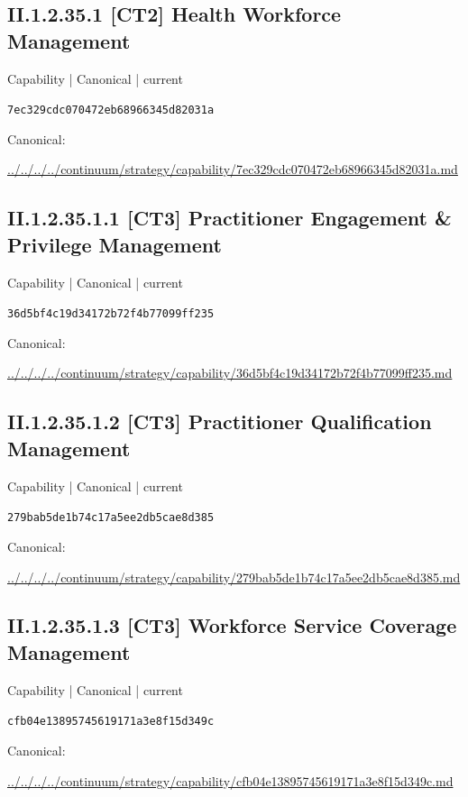 \documentclass[10pt,a4paper]{article}
\begin{document}
\subsection*{II.1.2.35.1 [CT2] Health Workforce Management}
{\small Capability | Canonical | current}\par
\texttt{7ec329cdc070472eb68966345d82031a}\par
Canonical: \par
{\footnotesize\url{../../../../continuum/strategy/capability/7ec329cdc070472eb68966345d82031a.md}}\par
\subsection*{II.1.2.35.1.1 [CT3] Practitioner Engagement \& Privilege Management}
{\small Capability | Canonical | current}\par
\texttt{36d5bf4c19d34172b72f4b77099ff235}\par
Canonical: \par
{\footnotesize\url{../../../../continuum/strategy/capability/36d5bf4c19d34172b72f4b77099ff235.md}}\par
\subsection*{II.1.2.35.1.2 [CT3] Practitioner Qualification Management}
{\small Capability | Canonical | current}\par
\texttt{279bab5de1b74c17a5ee2db5cae8d385}\par
Canonical: \par
{\footnotesize\url{../../../../continuum/strategy/capability/279bab5de1b74c17a5ee2db5cae8d385.md}}\par
\subsection*{II.1.2.35.1.3 [CT3] Workforce Service Coverage Management}
{\small Capability | Canonical | current}\par
\texttt{cfb04e13895745619171a3e8f15d349c}\par
Canonical: \par
{\footnotesize\url{../../../../continuum/strategy/capability/cfb04e13895745619171a3e8f15d349c.md}}\par
\end{document}
